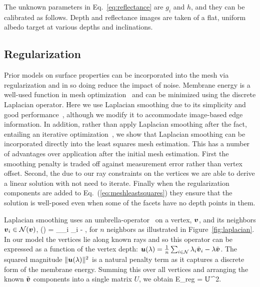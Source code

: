The unknown parameters in Eq.~\ref{eq:reflectance} are $g_i$ and $h$, and they can be calibrated as follows.   Depth and reflectance images are taken of a flat, uniform albedo target at various depths and inclinations.  




\subsection{Regularization}

Prior models on surface properties can be incorporated into the mesh via regularization and in so doing reduce the impact of noise.  Membrane energy is a well-used function in mesh optimization~\cite{Kobbelt:1998} and can be minimized using the discrete Laplacian operator.  Here we use Laplacian smoothing due to its simplicity and good performance~\cite{Kobbelt:1998,Ohtake2001789,Chen2005376}, although we modify it to accommodate image-based edge information.  In addition, rather than apply Laplacian smoothing after the fact, entailing an iterative optimization~\cite{Kobbelt:1998}, we show that Laplacian smoothing can be incorporated directly into the least squares mesh estimation.  This has a number of  advantages over application after the initial mesh estimation.  First the smoothing penalty is traded off against measurement error rather than vertex offset.  Second, the due to our ray constraints on the vertices we are able to derive a linear solution with not need to iterate.  Finally  when the regularization components are added to Eq.~(\ref{eq:meshleastsquares}) they ensure that the solution is well-posed even when some of the facets have no depth points in them.

Laplacian smoothing uses an umbrella-operator~\cite{Kobbelt:1998} on a vertex, $\boldsymbol{v}$, and its neighbors $\boldsymbol{v}_i\in\mathcal{N}(\boldsymbol{v})$,
\beq
{}(\vertex) = \sum_{\vertex_i\in{}} \vertex_i - \vertex,\label{eq:umbrella}
\eeq
for $n$ neighbors as illustrated in Figure~\ref{fig:laplacian}.  In our model the vertices lie along known rays and so this operator can be expressed as a function of the vertex depth: $\boldsymbol{u}(\lambda) = \frac{1}{n}\sum_{i\in\mathcal{N}} \lambda_i \tilde{\boldsymbol{v}}_i - \lambda\tilde{\boldsymbol{v}}$.  The squared magnitude $\|\boldsymbol{u}(\lambda)\|^2$ is a natural penalty term as it captures a discrete form of the membrane energy.  Summing this over all vertices and arranging the known $\tilde{\boldsymbol{v}}$ components into a single matrix $U$, we obtain
\beq
E_{reg} = \| U \vlambda \|^2.
\eeq

